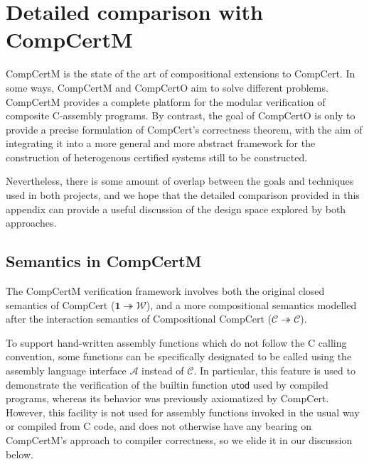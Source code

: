 \documentclass[sigplan,10pt,review]{acmart}
\newcommand{\kw}[1]{\ensuremath{ \mathsf{#1} }}
\begin{document}
\balance



\clearpage
\appendix
\nobalance

\section{Detailed comparison with CompCertM} %

CompCertM is the state of the art
of compositional extensions to CompCert.
In some ways,
CompCertM and CompCertO aim to solve different problems.
CompCertM provides a complete platform
for the modular verification of composite C-assembly programs.
By contrast,
the goal of CompCertO is only to
provide a precise formulation of CompCert's correctness theorem,
with the aim of integrating it into
a more general and more abstract framework
for the construction of heterogenous certified systems
still to be constructed.

Nevertheless,
there is some amount of overlap between
the goals and techniques used in both projects,
and we hope that the detailed comparison
provided in this appendix
can provide a useful discussion
of the design space explored by both approaches.

\subsection{Semantics in CompCertM} %

The CompCertM verification framework involves
both the original closed semantics of CompCert
($\mathbf{1} \twoheadrightarrow \mathcal{W}$),
and a more compositional semantics
modelled after the interaction semantics of Compositional CompCert
($\mathcal{C} \twoheadrightarrow \mathcal{C}$).

To support hand-written assembly functions
which do not follow the C calling convention,
some functions can be specifically designated
to be called
using the assembly language interface $\mathcal{A}$
instead of $\mathcal{C}$.
In particular,
this feature is used to demonstrate
the verification of the builtin function $\kw{utod}$
used by compiled programs,
whereas its behavior was previously
axiomatized by CompCert.
However,
this facility is not used for assembly functions
invoked in the usual way or compiled from C code,
and does not otherwise have any bearing on
CompCertM's approach to compiler correctness,
so we elide it in our discussion below.
\end{document}
